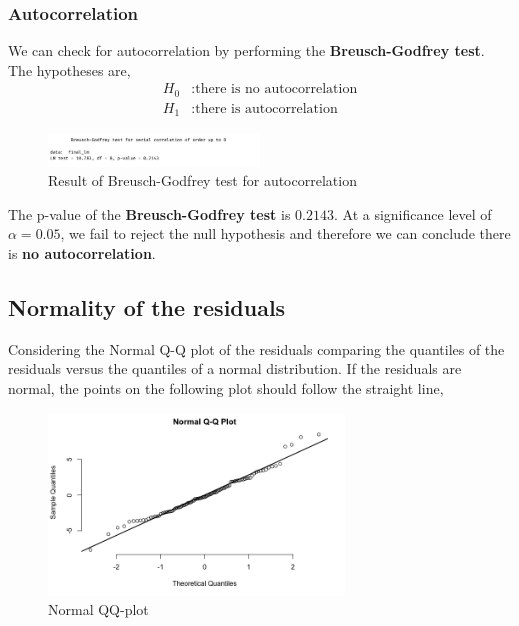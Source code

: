 

\subsubsection{Autocorrelation}

We can check for autocorrelation by performing the \textbf{Breusch-Godfrey test}. The hypotheses are,
\begin{align*}
	H_0&: \text{there is no autocorrelation} \\
	H_1&: \text{there is autocorrelation}
\end{align*}

\begin{figure}[H]
	\centering
	\includegraphics[width=0.5\textwidth]{figures/models/Breusch-Godfrey_test.png}
	\caption{Result of Breusch-Godfrey test for autocorrelation}
	\label{fig:breusch-godfrey-test}
\end{figure}

The p-value of the \textbf{Breusch-Godfrey test} is $0.2143$. At a significance level of $\alpha = 0.05$, we fail to reject the null hypothesis and therefore we can conclude there is \textbf{no autocorrelation}. 

\subsection{Normality of the residuals}

Considering the Normal Q-Q plot of the residuals comparing the quantiles of the residuals versus the quantiles of a normal distribution. If the residuals are normal, the points on the following plot should follow the straight line,

\begin{figure}[H]
	\centering
	\includegraphics[width=0.7\textwidth]{figures/models/normal-qq-plot.png}
	\caption{Normal QQ-plot}
	\label{fig:normal-qq-plot}
\end{figure}


